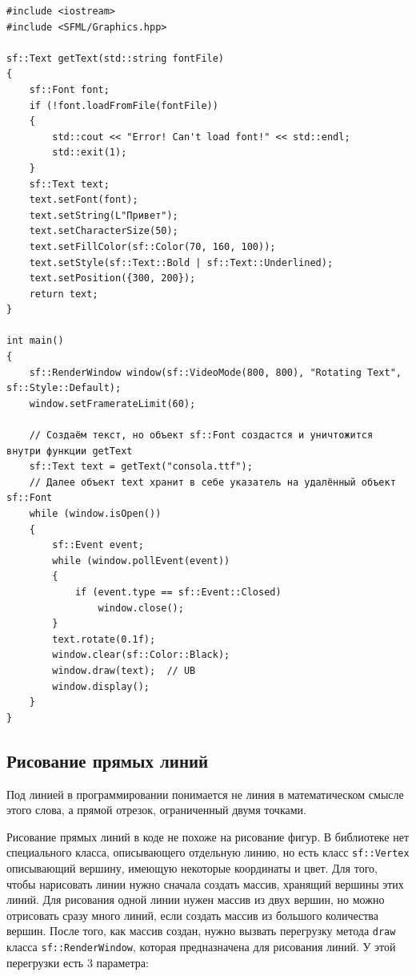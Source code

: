 \documentclass{article}
\begin{document}
\begin{lstlisting}
#include <iostream>
#include <SFML/Graphics.hpp>

sf::Text getText(std::string fontFile)
{
    sf::Font font;
    if (!font.loadFromFile(fontFile))
    {
        std::cout << "Error! Can't load font!" << std::endl;
        std::exit(1);
    }
    sf::Text text;
    text.setFont(font);
    text.setString(L"Привет");
    text.setCharacterSize(50);
    text.setFillColor(sf::Color(70, 160, 100));
    text.setStyle(sf::Text::Bold | sf::Text::Underlined);
    text.setPosition({300, 200});
    return text;
}

int main()
{
    sf::RenderWindow window(sf::VideoMode(800, 800), "Rotating Text", sf::Style::Default);
    window.setFramerateLimit(60);
    
    // Создаём текст, но объект sf::Font создастся и уничтожится внутри функции getText
    sf::Text text = getText("consola.ttf");
    // Далее объект text хранит в себе указатель на удалённый объект sf::Font
    while (window.isOpen())
    {
        sf::Event event;
        while (window.pollEvent(event)) 
        {
            if (event.type == sf::Event::Closed)
                window.close();
        }
        text.rotate(0.1f);
        window.clear(sf::Color::Black);
        window.draw(text);  // UB
        window.display();
    }
}
\end{lstlisting}

\newpage
\subsection*{Рисование прямых линий}
Под линией в программировании понимается не линия в математическом смысле этого слова, а прямой отрезок, ограниченный двумя точками.

Рисование прямых линий в коде не похоже на рисование фигур. В библиотеке нет специального класса, описывающего отдельную линию, но есть класс \texttt{sf::Vertex} описывающий вершину, имеющую некоторые координаты и цвет.
Для того, чтобы нарисовать линии нужно сначала создать массив, хранящий вершины этих линий. Для рисования одной линии нужен массив из двух вершин, но можно отрисовать сразу много линий, если создать массив из большого количества вершин.
После того, как массив создан, нужно вызвать перегрузку метода \texttt{draw} класса \texttt{sf::RenderWindow}, которая предназначена для рисования линий. У этой перегрузки есть 3 параметра:
\end{document}

